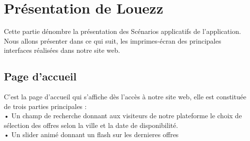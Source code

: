 \section{ Présentation de Louezz}

Cette partie dénombre la présentation des Scénarios applicatifs de l'application. Nous allons présenter dans ce qui suit, les imprimes-écran des principales interfaces réalisées dans notre site web.
\subsection{Page d'accueil}

C'est la page d'accueil qui s'affiche dès l'accès à notre site web, elle est constituée de trois parties principales :\\

• Un champ de recherche donnant aux visiteurs de notre plateforme le choix de sélection des offres selon la ville et la date de disponibilité.\\

• Un slider animé donnant un flash sur les dernieres offres\\



\begin{minipage}{\linewidth}
	\label{f3}%
\end{minipage}\\


